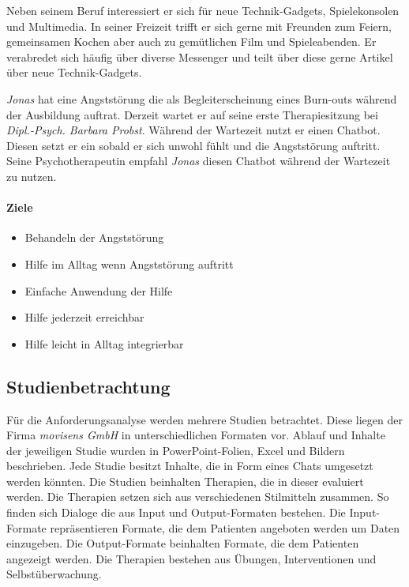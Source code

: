 Neben seinem Beruf interessiert er sich für neue Technik-Gadgets, Spielekonsolen und Multimedia. In seiner Freizeit trifft er sich gerne mit Freunden zum Feiern, gemeinsamen Kochen aber auch zu gemütlichen Film und Spieleabenden. Er verabredet sich häufig über diverse Messenger und teilt über diese gerne Artikel über neue Technik-Gadgets.

\emph{Jonas} hat eine Angststörung die als Begleiterscheinung eines Burn-outs während der Ausbildung auftrat.  Derzeit wartet er auf seine erste Therapiesitzung bei \emph{Dipl.-Psych. Barbara Probst}. Während der Wartezeit nutzt er einen Chatbot. Diesen setzt er ein sobald er sich unwohl fühlt und die Angststörung auftritt. Seine Psychotherapeutin empfahl \emph{Jonas} diesen Chatbot während der Wartezeit zu nutzen.

\paragraph{Ziele}
\begin{itemize}
\item Behandeln der Angststörung
\item Hilfe im Alltag wenn Angststörung auftritt
\item Einfache Anwendung der Hilfe
\item Hilfe jederzeit erreichbar
\item Hilfe leicht in Alltag integrierbar
\end{itemize}


\subsection{Studienbetrachtung}
Für die Anforderungsanalyse werden mehrere Studien betrachtet. Diese liegen der Firma \emph{movisens GmbH} in unterschiedlichen Formaten vor. Ablauf und Inhalte der jeweiligen Studie wurden in PowerPoint-Folien, Excel und Bildern beschrieben. Jede Studie besitzt Inhalte, die in Form eines Chats umgesetzt werden könnten. Die Studien beinhalten Therapien, die in dieser evaluiert werden. Die Therapien setzen sich aus verschiedenen Stilmitteln zusammen. So finden sich Dialoge die aus Input und Output-Formaten bestehen. Die Input-Formate repräsentieren Formate, die dem Patienten angeboten werden um Daten einzugeben. Die Output-Formate beinhalten Formate, die dem Patienten angezeigt werden. Die Therapien bestehen aus Übungen, Interventionen und Selbstüberwachung.


